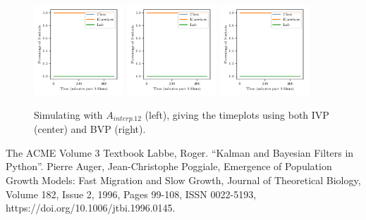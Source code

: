 \documentclass[11pt]{amsart}
\begin{document}
\begin{figure}[htp]
    \centering
    \includegraphics[width=0.3\textwidth]{temp.pdf}\hfill
    \includegraphics[width=0.3\textwidth]{temp.pdf}\hfill
    \includegraphics[width=0.3\textwidth]{temp.pdf}\hfill
    \caption{Simulating with $A_{interp.12}$ (left), giving the timeplots using both IVP (center) and BVP (right).}
    \label{fig:continuous_alpha}

\end{figure}









\FloatBarrier %
\newpage


\begin{thebibliography}{99}
 The ACME Volume 3 Textbook
 Labbe, Roger. “Kalman and Bayesian Filters in Python”.
 Pierre Auger, Jean-Christophe Poggiale, Emergence of Population Growth Models: Fast Migration and Slow Growth, Journal of Theoretical Biology, Volume 182, Issue 2, 1996, Pages 99-108, ISSN 0022-5193, https://doi.org/10.1006/jtbi.1996.0145.
\end{thebibliography}
\end{document}
